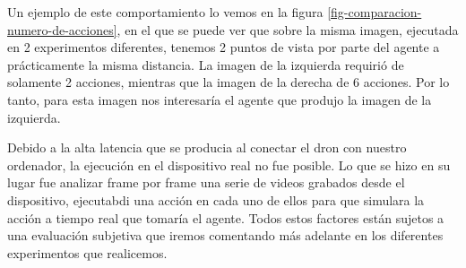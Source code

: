 Un ejemplo de este comportamiento lo vemos en la figura \ref{fig-comparacion-numero-de-acciones}, en el que se puede ver que sobre la misma imagen, ejecutada en 2 experimentos diferentes, tenemos 2 puntos de vista por parte del agente a prácticamente la misma distancia. La imagen de la izquierda requirió de solamente 2 acciones, mientras que la imagen de la derecha de 6 acciones. Por lo tanto, para esta imagen nos interesaría el agente que produjo la imagen de la izquierda.
\medskip

Debido a la alta latencia que se producia al conectar el dron con nuestro ordenador, la ejecución en el dispositivo real no fue posible. Lo que se hizo en su lugar fue analizar frame por frame una serie de videos grabados desde el dispositivo, ejecutabdi una acción en cada uno de ellos para que simulara la acción a tiempo real que tomaría el agente.
Todos estos factores están sujetos a una evaluación subjetiva que iremos comentando más adelante en los diferentes experimentos que realicemos.